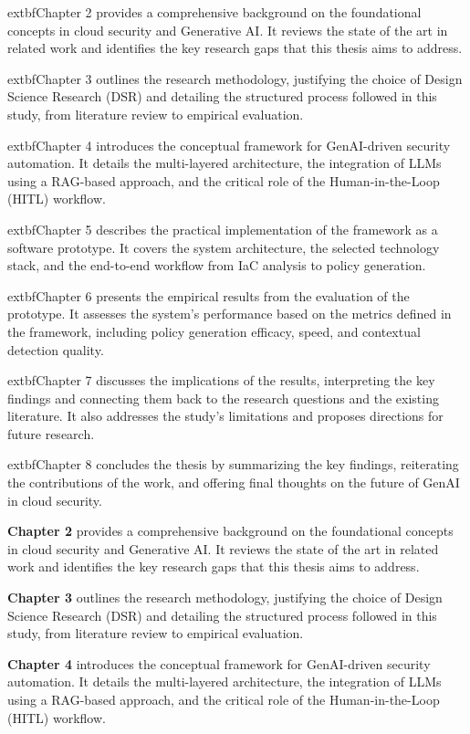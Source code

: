 	extbf{Chapter 2} provides a comprehensive background on the foundational concepts in cloud security and Generative AI. It reviews the state of the art in related work and identifies the key research gaps that this thesis aims to address.

	extbf{Chapter 3} outlines the research methodology, justifying the choice of Design Science Research (DSR) and detailing the structured process followed in this study, from literature review to empirical evaluation.

	extbf{Chapter 4} introduces the conceptual framework for GenAI-driven security automation. It details the multi-layered architecture, the integration of LLMs using a RAG-based approach, and the critical role of the Human-in-the-Loop (HITL) workflow.

	extbf{Chapter 5} describes the practical implementation of the framework as a software prototype. It covers the system architecture, the selected technology stack, and the end-to-end workflow from IaC analysis to policy generation.

	extbf{Chapter 6} presents the empirical results from the evaluation of the prototype. It assesses the system's performance based on the metrics defined in the framework, including policy generation efficacy, speed, and contextual detection quality.

	extbf{Chapter 7} discusses the implications of the results, interpreting the key findings and connecting them back to the research questions and the existing literature. It also addresses the study's limitations and proposes directions for future research.

	extbf{Chapter 8} concludes the thesis by summarizing the key findings, reiterating the contributions of the work, and offering final thoughts on the future of GenAI in cloud security.

\textbf{Chapter 2} provides a comprehensive background on the foundational concepts in cloud security and Generative AI. It reviews the state of the art in related work and identifies the key research gaps that this thesis aims to address.

\textbf{Chapter 3} outlines the research methodology, justifying the choice of Design Science Research (DSR) and detailing the structured process followed in this study, from literature review to empirical evaluation.

\textbf{Chapter 4} introduces the conceptual framework for GenAI-driven security automation. It details the multi-layered architecture, the integration of LLMs using a RAG-based approach, and the critical role of the Human-in-the-Loop (HITL) workflow.

